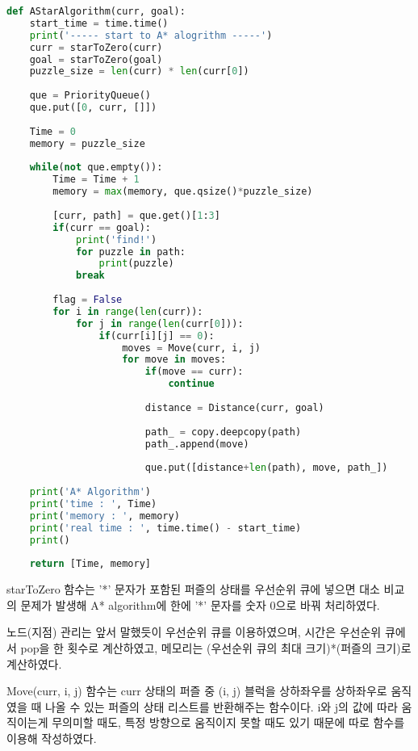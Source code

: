 \documentclass[manuscript,screen,review]{acmart}
\begin{document}
\begin{lstlisting}[language=python, caption=AStarAlgorithm function] 
def AStarAlgorithm(curr, goal):
    start_time = time.time()
    print('----- start to A* alogrithm -----')
    curr = starToZero(curr)
    goal = starToZero(goal)
    puzzle_size = len(curr) * len(curr[0])
    
    que = PriorityQueue()
    que.put([0, curr, []])
    
    Time = 0
    memory = puzzle_size
    
    while(not que.empty()):
        Time = Time + 1
        memory = max(memory, que.qsize()*puzzle_size)
        
        [curr, path] = que.get()[1:3]
        if(curr == goal):
            print('find!')
            for puzzle in path:
                print(puzzle)
            break
        
        flag = False
        for i in range(len(curr)):
            for j in range(len(curr[0])):
                if(curr[i][j] == 0):
                    moves = Move(curr, i, j)
                    for move in moves:
                        if(move == curr):
                            continue
                        
                        distance = Distance(curr, goal)
                        
                        path_ = copy.deepcopy(path)
                        path_.append(move)
                        
                        que.put([distance+len(path), move, path_])
                
    print('A* Algorithm')
    print('time : ', Time)
    print('memory : ', memory)
    print('real time : ', time.time() - start_time)
    print()
    
    return [Time, memory]
\end{lstlisting}

starToZero 함수는 '*' 문자가 포함된 퍼즐의 상태를 우선순위 큐에 넣으면 대소 비교의 문제가 발생해 A* algorithm에 한에 '*' 문자를 숫자 0으로 바꿔 처리하였다.

노드(지점) 관리는 앞서 말했듯이 우선순위 큐를 이용하였으며, 시간은 우선순위 큐에서 pop을 한 횟수로 계산하였고, 메모리는 (우선순위 큐의 최대 크기)*(퍼즐의 크기)로 계산하였다.

Move(curr, i, j) 함수는 curr 상태의 퍼즐 중 (i, j) 블럭을 상하좌우를 상하좌우로 움직였을 때 나올 수 있는 퍼즐의 상태 리스트를 반환해주는 함수이다. i와 j의 값에 따라 움직이는게 무의미할 때도, 특정 방향으로 움직이지 못할 때도 있기 때문에 따로 함수를 이용해 작성하였다.
\end{document}
